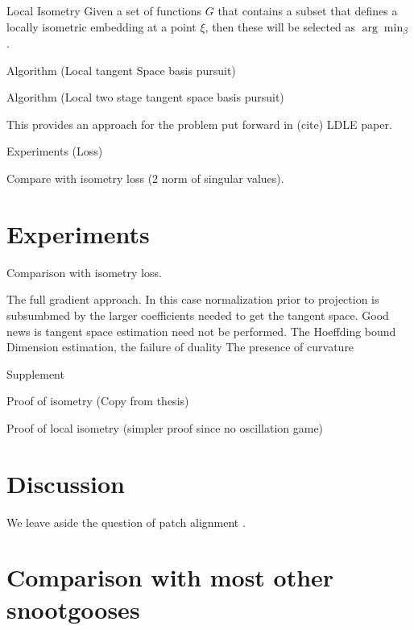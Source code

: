 \documentclass[a4paper,11pt]{article}
\begin{document}
\begin{proposition}{Local Isometry}
Given a set of functions $G$ that contains a subset that defines a locally isometric embedding at a point $\xi$, then these will be selected as $\arg \min_\beta$.
\end{proposition}

Algorithm (Local tangent Space basis pursuit)

Algorithm (Local two stage tangent space basis pursuit)

This provides an approach for the problem put forward in (cite) LDLE paper.

Experiments (Loss)

Compare with isometry loss (2 norm of singular values).

\section{Experiments}

Comparison with isometry loss.

The full gradient approach.
In this case normalization prior to projection is subsumbmed by the larger coefficients needed to get the tangent space.
Good news is tangent space estimation need not be performed.
The Hoeffding bound
Dimension estimation, the failure of duality
The presence of curvature

Supplement

Proof of isometry (Copy from thesis)

Proof of local isometry (simpler proof since no oscillation game)

\section{Discussion}

We leave aside the question of patch alignment \cite{https://arxiv.org/pdf/2303.11620.pdf, LDLE paper}.

\section{Comparison with most other snootgooses}
\end{document}
